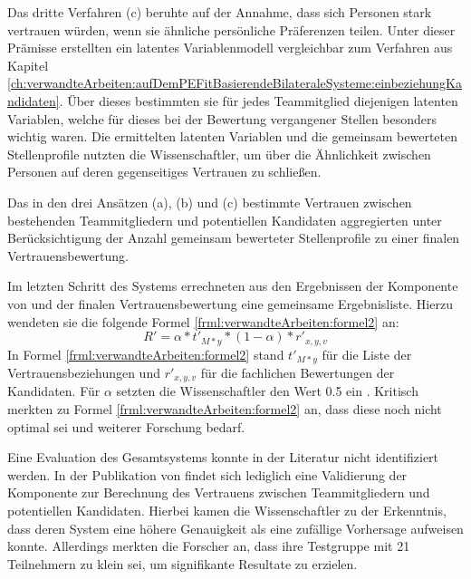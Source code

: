 Das dritte Verfahren (c) beruhte auf der Annahme, dass sich Personen stark vertrauen würden, wenn sie ähnliche persönliche Präferenzen teilen. Unter dieser Prämisse erstellten \textcite[S. 6f.]{malinowski:2005} ein latentes Variablenmodell vergleichbar zum Verfahren aus Kapitel \ref{ch:verwandteArbeiten:aufDemPEFitBasierendeBilateraleSysteme:einbeziehungKandidaten}. Über dieses bestimmten sie für jedes Teammitglied diejenigen latenten Variablen, welche für dieses bei der Bewertung vergangener Stellen besonders wichtig waren. Die ermittelten latenten Variablen und die gemeinsam bewerteten Stellenprofile nutzten die Wissenschaftler, um über die Ähnlichkeit zwischen Personen auf deren gegenseitiges Vertrauen zu schließen.

Das in den drei Ansätzen (a), (b) und (c) bestimmte Vertrauen zwischen bestehenden Teammitgliedern und potentiellen Kandidaten aggregierten \textcite[S. 7ff.]{malinowski:2005} unter Berücksichtigung der Anzahl gemeinsam bewerteter Stellenprofile zu einer finalen Vertrauensbewertung.

Im letzten Schritt des Systems errechneten \textcite[S. 9f.]{malinowski:2005} aus den Ergebnissen der Komponente von \textcite[S. 8ff.]{faerber:2003} und der finalen Vertrauensbewertung eine gemeinsame Ergebnisliste. Hierzu wendeten sie die folgende Formel \ref{frml:verwandteArbeiten:formel2} an:
\begin{equation}
	R' = \alpha * t'_{M*y} * (1-\alpha) * r'_{x,y,v}
	\label{frml:verwandteArbeiten:formel2}
\end{equation}
In Formel \ref{frml:verwandteArbeiten:formel2} stand $t'_{M*y}$ für die Liste der Vertrauensbeziehungen und $r'_{x,y,v}$ für die fachlichen Bewertungen der Kandidaten. Für $\alpha$ setzten die Wissenschaftler den Wert 0.5 ein \cite[S. 4ff.]{malinowski:2005}. Kritisch merkten \textcite[S. 9]{malinowski:2005} zu Formel \ref{frml:verwandteArbeiten:formel2} an, dass diese noch nicht optimal sei und weiterer Forschung bedarf.

Eine Evaluation des Gesamtsystems konnte in der Literatur nicht identifiziert werden. In der Publikation von \textcite[S. 13ff.]{malinowski:2008} findet sich lediglich eine Validierung der Komponente zur Berechnung des Vertrauens zwischen Teammitgliedern und potentiellen Kandidaten. Hierbei kamen die Wissenschaftler zu der Erkenntnis, dass deren System eine höhere Genauigkeit als eine zufällige Vorhersage aufweisen konnte. Allerdings merkten die Forscher an, dass ihre Testgruppe mit 21 Teilnehmern zu klein sei, um signifikante Resultate zu erzielen.

